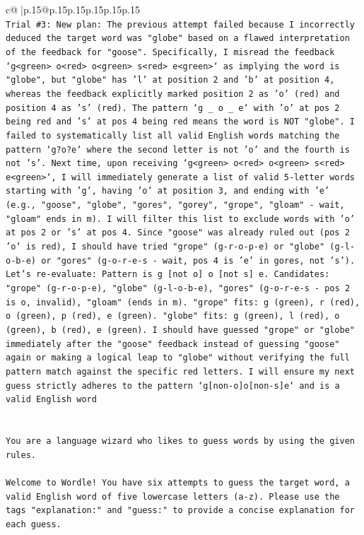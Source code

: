 \documentclass{article}
\begin{document}
{\begin{supertabular}{c@{$\;$}|p{.15\linewidth}@{}p{.15\linewidth}p{.15\linewidth}p{.15\linewidth}p{.15\linewidth}p{.15\linewidth}}
{{{\\ 
\texttt{Trial \#3: New plan: The previous attempt failed because I incorrectly deduced the target word was "globe" based on a flawed interpretation of the feedback for "goose". Specifically, I misread the feedback `g<green> o<red> o<green> s<red> e<green>` as implying the word is "globe", but "globe" has 'l' at position 2 and 'b' at position 4, whereas the feedback explicitly marked position 2 as 'o' (red) and position 4 as 's' (red). The pattern `g \_ o \_ e` with 'o' at pos 2 being red and 's' at pos 4 being red means the word is NOT "globe". I failed to systematically list all valid English words matching the pattern `g?o?e` where the second letter is not 'o' and the fourth is not 's'. Next time, upon receiving `g<green> o<red> o<green> s<red> e<green>`, I will immediately generate a list of valid 5{-}letter words starting with 'g', having 'o' at position 3, and ending with 'e' (e.g., "goose", "globe", "gores", "gorey", "grope", "gloam" {-} wait, "gloam" ends in m). I will filter this list to exclude words with 'o' at pos 2 or 's' at pos 4. Since "goose" was already ruled out (pos 2 'o' is red), I should have tried "grope" (g{-}r{-}o{-}p{-}e) or "globe" (g{-}l{-}o{-}b{-}e) or "gores" (g{-}o{-}r{-}e{-}s {-} wait, pos 4 is 'e' in gores, not 's'). Let's re{-}evaluate: Pattern is g {[}not o{]} o {[}not s{]} e. Candidates: "grope" (g{-}r{-}o{-}p{-}e), "globe" (g{-}l{-}o{-}b{-}e), "gores" (g{-}o{-}r{-}e{-}s {-} pos 2 is o, invalid), "gloam" (ends in m). "grope" fits: g (green), r (red), o (green), p (red), e (green). "globe" fits: g (green), l (red), o (green), b (red), e (green). I should have guessed "grope" or "globe" immediately after the "goose" feedback instead of guessing "goose" again or making a logical leap to "globe" without verifying the full pattern match against the specific red letters. I will ensure my next guess strictly adheres to the pattern `g{[}non{-}o{]}o{[}non{-}s{]}e` and is a valid English word} \\
\\ 
\\ 
\texttt{You are a language wizard who likes to guess words by using the given rules.} \\
\\ 
\texttt{Welcome to Wordle! You have six attempts to guess the target word, a valid English word of five lowercase letters (a{-}z). Please use the tags "explanation:" and "guess:" to provide a concise explanation for each guess.} \\
\\ 
}}}
\end{supertabular}}
\end{document}
